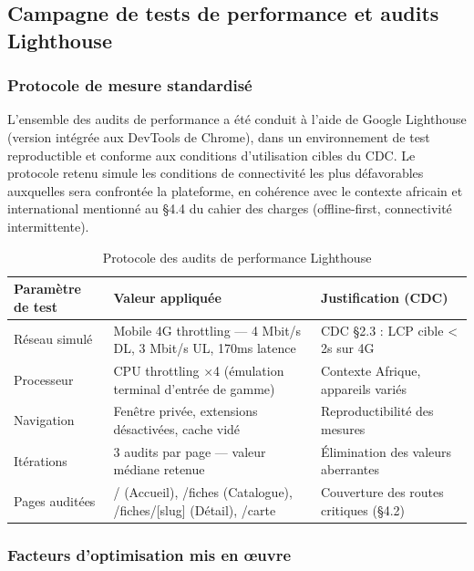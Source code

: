 \documentclass[12pt,a4paper]{report}
\begin{document}
\subsection{Campagne de tests de performance et audits Lighthouse}

\subsubsection*{Protocole de mesure standardisé}

L'ensemble des audits de performance a été conduit à l'aide de Google Lighthouse (version intégrée aux DevTools de Chrome), dans un environnement de test reproductible et conforme aux conditions d'utilisation cibles du CDC. Le protocole retenu simule les conditions de connectivité les plus défavorables auxquelles sera confrontée la plateforme, en cohérence avec le contexte africain et international mentionné au §4.4 du cahier des charges (offline-first, connectivité intermittente).

\begin{table}[H]
\centering
\caption{Protocole des audits de performance Lighthouse}
\label{tab:lighthouse_protocol}
\renewcommand{\arraystretch}{1.4}
\small
\begin{tabular}{|p{}|p{}|p{}|}
\hline
\textbf{Paramètre de test} & \textbf{Valeur appliquée} & \textbf{Justification (CDC)} \\
\hline
Réseau simulé & Mobile 4G throttling --- 4 Mbit/s DL, 3 Mbit/s UL, 170ms latence & CDC §2.3 : LCP cible < 2s sur 4G \\
\hline
Processeur & CPU throttling $\times$4 (émulation terminal d'entrée de gamme) & Contexte Afrique, appareils variés \\
\hline
Navigation & Fenêtre privée, extensions désactivées, cache vidé & Reproductibilité des mesures \\
\hline
Itérations & 3 audits par page --- valeur médiane retenue & Élimination des valeurs aberrantes \\
\hline
Pages auditées & / (Accueil), /fiches (Catalogue), /fiches/[slug] (Détail), /carte & Couverture des routes critiques (§4.2) \\
\hline
\end{tabular}
\end{table}

\subsubsection*{Facteurs d'optimisation mis en œuvre}
\end{document}
